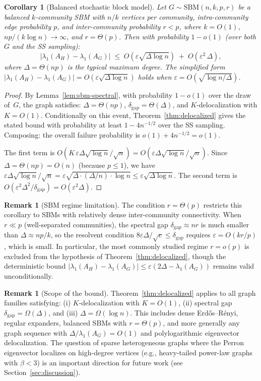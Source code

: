 \documentclass[11pt]{article}
\newtheorem{corollary}[theorem]{Corollary}
\theoremstyle{definition}
\newtheorem{remark}[theorem]{Remark}
\newcommand{\eps}{\varepsilon}
\newcommand{\lamH}{\lambda_1(A_H)}
\newcommand{\lamG}{\lambda_1(A_G)}
\begin{document}
\begin{corollary}[Balanced stochastic block model]\label{cor:sbm}
Let $G \sim \mathrm{SBM}(n, k, p, r)$ be a balanced $k$-community SBM with
$n/k$ vertices per community, intra-community edge probability $p$, and
inter-community probability $r < p$, where $k = O(1)$, $np/(k\log n) \to \infty$,
and $r = \Theta(p)$.
Then with probability $1 - o(1)$ (over both $G$ and the SS sampling):
\[
|\lamH - \lamG| \;\leq\;
O\!\left(\eps\sqrt{\Delta\log n}\right)
\;+\; O\!\left(\eps^2\,\Delta\right),
\]
where $\Delta = \Theta(np)$ is the typical maximum degree.
The simplified form $|\lamH - \lamG| = O(\eps\sqrt{\Delta\log n})$ holds when
$\eps = O(\sqrt{\log n/\Delta})$.
\end{corollary}

\begin{proof}
By Lemma~\ref{lem:sbm-spectral}, with probability $1 - o(1)$ over the draw of~$G$,
the graph satisfies:
$\Delta = \Theta(np)$, $\delta_{\mathrm{gap}} = \Theta(\Delta)$, and
$K$-delocalization with $K = O(1)$.
Conditionally on this event, Theorem~\ref{thm:delocalized} gives the stated bound
with probability at least $1 - 4n^{-1/2}$ over the SS sampling.
Composing: the overall failure probability is $o(1) + 4n^{-1/2} = o(1)$.

The first term is
$O(K\,\eps\Delta\sqrt{\log n}/\sqrt{n}) = O(\eps\Delta\sqrt{\log n}/\sqrt{n})$.
Since $\Delta = \Theta(np) = O(n)$ (because $p \leq 1$), we have
$\eps\Delta\sqrt{\log n}/\sqrt{n}
= \eps\sqrt{\Delta \cdot (\Delta/n) \cdot \log n}
\leq \eps\sqrt{\Delta\log n}$.
The second term is $O(\eps^2\Delta^2/\delta_{\mathrm{gap}}) = O(\eps^2\Delta)$.
\end{proof}

\begin{remark}[SBM regime limitation]
The condition $r = \Theta(p)$ restricts this corollary to SBMs with relatively dense
inter-community connectivity. When $r \ll p$ (well-separated communities), the spectral
gap $\delta_{\mathrm{gap}} \approx nr$ is much smaller than
$\Delta \approx np/k$, so the resolvent condition $8\eps\Delta/\sqrt{c} \leq
\delta_{\mathrm{gap}}$ requires $\eps = O(kr/p)$, which is small. In particular, the
most commonly studied regime $r = o(p)$ is excluded from the hypothesis of
Theorem~\ref{thm:delocalized}, though the deterministic bound
$|\lamH - \lamG| \leq \eps(2\Delta - \lamG)$ remains valid unconditionally.
\end{remark}

\begin{remark}[Scope of the bound]
Theorem~\ref{thm:delocalized} applies to all graph
families satisfying: (i) $K$-delocalization with $K = O(1)$, (ii) spectral gap
$\delta_{\mathrm{gap}} = \Omega(\Delta)$, and (iii) $\Delta = \Omega(\log n)$. This
includes dense Erd\H{o}s--R\'{e}nyi, regular expanders, balanced SBMs with $r = \Theta(p)$,
and more generally
any graph sequence with $\Delta/\lamG = O(1)$ and polylogarithmic eigenvector
delocalization. The question of sparse heterogeneous graphs where the
Perron eigenvector localizes on high-degree vertices (e.g., heavy-tailed power-law graphs
with $\beta < 3$) is an important direction for future work
(see Section~\ref{sec:discussion}).
\end{remark}
\end{document}

